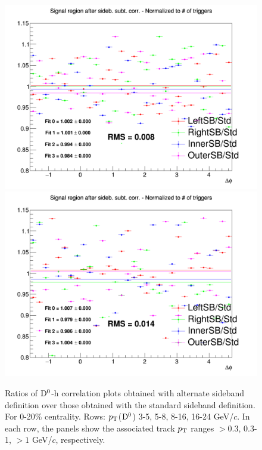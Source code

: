 \begin{figure}
{\includegraphics[width=0.31\linewidth]{figuresVsCent/Dzero/SystSideb/020/Ratio_AzimCorrDistr_Dzero_Canvas_PtIntBins12to12_PoolInt_thr03to1.png}}
{\includegraphics[width=0.31\linewidth]{figuresVsCent/Dzero/SystSideb/020/Ratio_AzimCorrDistr_Dzero_Canvas_PtIntBins12to12_PoolInt_thr1to99.png}} \\
 \caption{Ratios of ${\rm D^0}$-h correlation plots obtained with alternate sideband definition over those obtained with the standard sideband definition. For 0-20\% centrality. Rows: $p_{\rm T}$(${\rm D^0}$) 3-5, 5-8, 8-16, 16-24 GeV/$c$. In each row, the panels show the associated track
$p_{\rm T}$ ranges $> 0.3$, 0.3-1, $> 1$ GeV/$c$, respectively.}
\label{fig:SysBkg020}
\end{figure}


